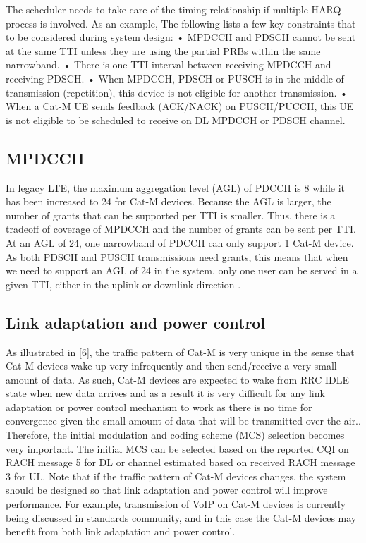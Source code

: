 \documentclass[conference,compsoc]{IEEEtran}
\begin{document}
The scheduler needs to take care of the timing relationship if multiple HARQ process is involved. As an example, The following lists a few key constraints that to be considered during system design:
•	MPDCCH and PDSCH cannot be sent at the same TTI unless they are using the partial PRBs within the same narrowband.
•	There is one TTI interval between receiving MPDCCH and receiving PDSCH.
•	When MPDCCH, PDSCH or PUSCH is in the middle of transmission (repetition), this device is not eligible for another transmission.
•	When a Cat-M UE sends feedback (ACK/NACK) on PUSCH/PUCCH, this UE is not eligible to be scheduled to receive on DL MPDCCH or PDSCH channel.

\subsection{MPDCCH}
In legacy LTE, the maximum aggregation level (AGL) of PDCCH is 8 while it has been increased to 24 for Cat-M devices. Because the AGL is larger, the number of grants that can be supported per TTI is smaller. Thus, there is a tradeoff of coverage of MPDCCH and the number of grants can be sent per TTI. At an AGL of 24, one narrowband of PDCCH can only support 1 Cat-M device. As both PDSCH and PUSCH transmissions need grants, this means that when we need to support an AGL of 24 in the system, only one user can be served in a given TTI, either in the uplink or downlink direction  .
\subsection{Link adaptation and power control}
As illustrated in [6], the traffic pattern of Cat-M is very unique in the sense that Cat-M devices wake up very infrequently and then send/receive a very small amount of data. As such, Cat-M devices are expected to wake from RRC IDLE state when new data arrives and as a result it is very difficult for any link adaptation or power control mechanism to work as there is no time for convergence given the small amount of data that will be transmitted over the air..  Therefore, the initial modulation and coding scheme (MCS) selection becomes very important. The initial MCS can be selected based on the reported CQI on RACH message 5 for DL or channel estimated based on received  RACH message 3 for UL. Note that if the traffic pattern of Cat-M devices changes, the system should be designed so that link adaptation and power control will improve performance. For example, transmission of VoIP on Cat-M devices is currently being discussed in standards community, and in this case the Cat-M devices may benefit from both link adaptation and power control.
\end{document}
